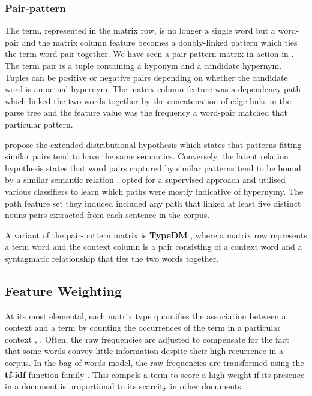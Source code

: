 \subsubsection{Pair-pattern}
The term, represented in the matrix row, is no longer a single word but a word-pair and the matrix column feature becomes a doubly-linked pattern which ties the term word-pair together.  We have seen a pair-pattern matrix in action in \citep{Snow2004}.  The term pair is a tuple containing a hyponym and a candidate hypernym.  Tuples can be positive or negative pairs depending on whether the candidate word is an actual hypernym.  The matrix column feature was a dependency path which linked the two words together by the concatenation of edge links in the parse tree and the feature value was the frequency a word-pair matched that particular pattern.

\citet{lin2001discovery} propose the extended distributional hypothesis which states that patterns fitting similar pairs tend to have the same semantics.  Conversely, the latent relation hypothesis states that word pairs captured by similar patterns tend to be bound by a similar semantic relation \citep{turney2010frequency}.  \citet{Snow2004} opted for a supervised approach and utilised various classifiers to learn which paths were mostly indicative of hypernymy.  The path feature set they induced included any path that linked at least five distinct nouns pairs extracted from each sentence in the corpus.  

A variant of the pair-pattern matrix is \textbf{TypeDM} \citep{roller2014inclusive}, where a matrix row represents a term word and the context column is a pair consisting of a context word and a syntagmatic relationship that ties the two words together.

\subsection{Feature Weighting}
At its most elemental, each matrix type quantifies the association between a context and a term by counting the occurrences of the term in a particular context \citep{turney2010frequency}, \citep{shwartz2017siege}.  Often, the raw frequencies are adjusted to compensate for the fact that some words convey little information despite their high recurrence in a corpus.  In the bag of words model, the raw frequencies are transformed using the \textbf{\ac{tf-idf}} function family \citep{turney2010frequency}.  This compels a term to score a high weight if its presence in a document is proportional to its scarcity in other documents.

